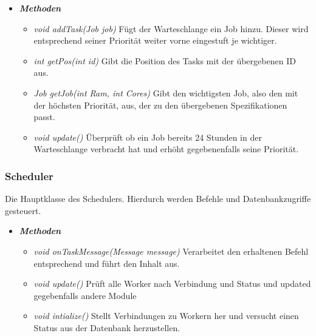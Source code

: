 \documentclass[a4paper,12pt]{article}
\begin{document}
\begin{itemize}[label={}]

\item \textit{\textbf{Methoden}}
\begin{itemize}[label={\textbullet}]

\item \textit{void addTask(Job job)} Fügt der Warteschlange ein Job hinzu. Dieser wird entsprechend seiner Priorität weiter vorne eingestuft je wichtiger.

\item \textit{int getPos(int id)} Gibt die Position des Tasks mit der übergebenen ID aus.

\item \textit{Job getJob(int Ram, int Cores)} Gibt den wichtigsten Job, also den mit der höchsten Priorität,  aus, der zu den übergebenen Spezifikationen passt.

\item \textit{void update()} Überprüft ob ein Job bereits 24 Stunden in der Warteschlange verbracht hat und erhöht gegebenenfalls seine Priorität.

\end{itemize}

\end{itemize}

\clearpage

\subsubsection{Scheduler}

Die Hauptklasse des Schedulers. Hierdurch werden Befehle und Datenbankzugriffe gesteuert.
\begin{itemize}[label={}]
	
	\item \textit{\textbf{Methoden}}
	\begin{itemize}[label={\textbullet}]
		
		\item \textit{void onTaskMessage(Message message)} Verarbeitet den erhaltenen Befehl entsprechend und führt den Inhalt aus.
		
		\item \textit{void update()} Prüft alle Worker nach Verbindung und Status und updated gegebenfalls andere Module
		
		\item \textit{void intialize()} Stellt Verbindungen zu Workern her und versucht einen Status aus der Datenbank herzustellen. 
		
	\end{itemize}
	
\end{itemize}
\end{document}
